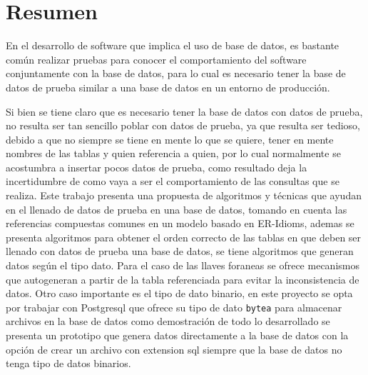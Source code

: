\chapter*{Resumen}
\thispagestyle{empty}
\renewcommand{\footrulewidth}{0.0pt}%
En el desarrollo de software que implica el uso de base de datos, es bastante com\'un realizar pruebas para conocer el comportamiento del software conjuntamente con la base de datos, para lo cual es necesario tener la base de datos de prueba similar a una base de datos en un entorno de producci\'on. 

Si bien se tiene claro que es necesario tener la base de datos con datos de prueba, no resulta ser tan sencillo poblar con datos de prueba, ya que resulta ser tedioso, debido a que no siempre se tiene en mente lo que se quiere, tener en mente nombres de las tablas y quien referencia a quien, por lo cual normalmente se acostumbra a insertar pocos datos de prueba, como resultado deja la incertidumbre de como vaya a ser el comportamiento de las consultas que se realiza. Este trabajo presenta una propuesta de algoritmos y t\'ecnicas  que ayudan en el llenado de datos de prueba en una base de datos, tomando en cuenta las referencias compuestas comunes en un modelo basado en ER-Idioms, ademas se presenta algoritmos para obtener el orden correcto de las tablas en que deben ser llenado con datos de prueba una base de datos, se tiene algoritmos que generan datos seg\'un el tipo dato. Para el caso de las llaves foraneas se ofrece mecanismos que autogeneran a partir de la tabla referenciada para evitar la inconsistencia de datos. Otro caso importante es el tipo de dato binario, en este proyecto se opta por trabajar con Postgresql que ofrece su tipo de dato \texttt{bytea} para almacenar archivos en la base de datos como demostraci\'on de todo lo desarrollado se presenta un prototipo que genera datos directamente a la base de datos con la opci\'on de crear un archivo con extension sql siempre que la base de datos no tenga tipo de datos binarios.
